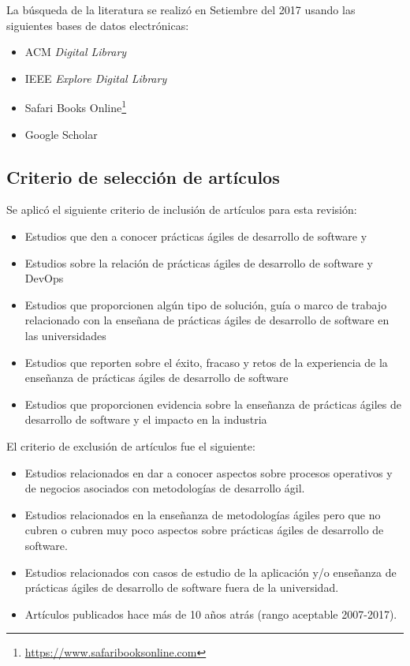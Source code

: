 \documentclass[journal]{IEEEtran}
\begin{document}
La búsqueda de la literatura se realizó en Setiembre del 2017 usando las siguientes bases de datos electrónicas:
\begin{itemize}
    \item ACM \emph{Digital Library} 
    \item IEEE \emph{Explore Digital Library}
    \item Safari Books Online\footnote{\url{https://www.safaribooksonline.com}}
    \item Google Scholar
\end{itemize}

\subsection{Criterio de selección de artículos}
Se aplicó el siguiente criterio de inclusión de artículos para esta revisión:
\begin{itemize}
    \item Estudios que den a conocer prácticas ágiles de desarrollo de software y 
    \item Estudios sobre la relación de prácticas ágiles de desarrollo de software y DevOps 
    \item Estudios que proporcionen algún tipo de solución, guía o marco de trabajo relacionado con la enseñana de prácticas ágiles de desarrollo de software en las universidades
    \item Estudios que reporten sobre el éxito, fracaso y retos de la experiencia de la enseñanza de prácticas ágiles de desarrollo de software
    \item Estudios que proporcionen evidencia sobre la enseñanza de prácticas ágiles de desarrollo de software y el impacto en la industria
\end{itemize}

El criterio de exclusión de artículos fue el siguiente:
\begin{itemize}
    \item Estudios relacionados en dar a conocer aspectos sobre procesos operativos y de negocios asociados con metodologías de desarrollo ágil.
    \item Estudios relacionados en la enseñanza de metodologías ágiles pero que no cubren o cubren muy poco aspectos sobre prácticas ágiles de desarrollo de software.
    \item Estudios relacionados con casos de estudio de la aplicación y/o enseñanza de prácticas ágiles de desarrollo de software fuera de la universidad.
    \item Artículos publicados hace más de 10 años atrás (rango aceptable 2007-2017).
\end{itemize}
\end{document}
